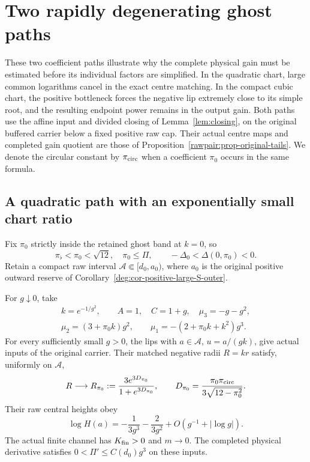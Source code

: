 \section{Two rapidly degenerating ghost paths}
\label{app:raw-tail-stress}

These two coefficient paths illustrate why the complete physical gain
must be estimated before its individual factors are simplified. In the
quadratic chart, large common logarithms cancel in the exact centre
matching. In the compact cubic chart, the positive bottleneck forces the
negative lip extremely close to its simple root, and the resulting
endpoint power remains in the output gain.
Both paths use the affine input and divided closing of
Lemma~\ref{lem:closing}, on the original buffered carrier below a fixed
positive raw cap. Their actual centre maps and completed gain quotient
are those of Proposition~\ref{rawpair:prop-original-tails}.
We denote the circular constant by
\(\pi_{\rm circ}\) when a coefficient \(\pi_0\) occurs in the same formula.

\subsection{A quadratic path with an exponentially small chart ratio}
\label{rawstress:subsec-quadratic}

Fix \(\pi_0\) strictly inside the retained ghost band at \(k=0\), so
\[
 \pi_\flat<\pi_0<\sqrt{12},\quad \pi_0\le\Pi,\qquad
                  -\Delta_0<\Delta(0,\pi_0)<0.
\]
Retain a compact raw interval
\(\mathcal A\Subset[d_0,a_0)\), where \(a_0\) is the original positive
outward reserve of Corollary~\ref{deg:cor-positive-large-S-outer}.

\begin{proposition}\label{rawstress:prop-quadratic}
For \(g\downarrow0\), take
\begin{equation}\label{rawstress:eq-quadratic-coefficients}
 \begin{gathered}
 k=e^{-1/g^2},\qquad A=1,\quad C=1+g,\quad \mu_3=-g-g^2,\\
 \mu_2=(3+\pi_0k)g^2,\qquad
 \mu_1=-(2+\pi_0k+k^2)g^3.
 \end{gathered}
\end{equation}
For every sufficiently small \(g>0\), the lips with
\(a\in\mathcal A\), \(u=a/(gk)\), give actual inputs of the original
carrier. Their matched negative radii \(R=kr\) satisfy, uniformly on
\(\mathcal A\),
\begin{equation}\label{rawstress:eq-quadratic-radius}
 R\longrightarrow R_{\pi_0}:=
 \frac{3e^{3D_{\pi_0}}}{1+e^{3D_{\pi_0}}},\qquad
 D_{\pi_0}=\frac{\pi_0\pi_{\rm circ}}
                       {3\sqrt{12-\pi_0^2}}.
\end{equation}
Their raw central heights obey
\begin{equation}\label{rawstress:eq-quadratic-height}
 \log H(a)=-\frac1{3g^3}-\frac2{3g^2}
                                    +O(g^{-1}+|\log g|).
\end{equation}
The actual finite channel has \(K_{\rm fin}>0\) and \(m\to0\).
The completed physical derivative satisfies
\(0<\Pi'\le C(d_0)g^3\) on these inputs.
\end{proposition}

